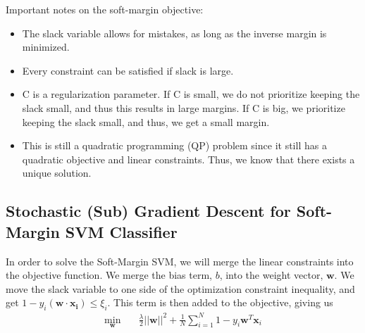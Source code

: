 \documentclass[11pt]{article}
\begin{document}
Important notes on the soft-margin objective:
\begin{itemize}
    \item The slack variable allows for mistakes, as long as the inverse margin is minimized.
    \item Every constraint can be satisfied if slack is large. 
    \item C is a regularization parameter. If C is small, we do not prioritize keeping the slack small, and thus this results in large margins. If C is big, we prioritize keeping the slack small, and thus, we get a small margin. 
    \item This is still a quadratic programming (QP) problem since it still has a quadratic objective and linear constraints. Thus, we know that there exists a unique solution.
\end{itemize}







\subsection{Stochastic (Sub) Gradient Descent for Soft-Margin SVM Classifier}
In order to solve the Soft-Margin SVM, we will merge the linear constraints into the objective function.
We merge the bias term, $b$, into the weight vector, $\mathbf{w}$. We move the slack variable to one side of the optimization constraint inequality, and get $1 - y_i(\mathbf{w} \cdot \mathbf{x_{i}}) \leq \xi_i$. This term is then added to the objective, giving us
\begin{equation}
\begin{aligned}
\min_{\mathbf{w}} \quad & \frac{\lambda}{2}||\mathbf{w}||^2 + \frac{1}{N}\sum_{i=1}^N 1 - y_i \mathbf{w}^T \mathbf{x}_i \\
\end{aligned}
\end{equation}
\end{document}
